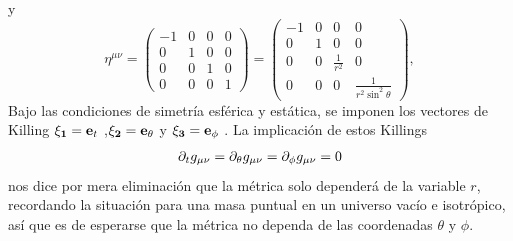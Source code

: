y
\begin{equation}
    \eta^{\mu \nu}=\left(\begin{array}{cccc}
            -1 & 0 & 0 & 0 \\
            0  & 1 & 0 & 0 \\
            0  & 0 & 1 & 0 \\
            0  & 0 & 0 & 1
        \end{array}\right)=\left(\begin{array}{cccc}
            -1 & 0 & 0               & 0                                \\
            0  & 1 & 0               & 0                                \\
            0  & 0 & \frac{1}{r^{2}} & 0                                \\
            0  & 0 & 0               & \frac{1}{r^{2} \sin ^{2} \theta}
        \end{array}\right),
\end{equation}
Bajo las condiciones de simetría esférica y estática, se imponen los  vectores de Killing $\mathbf{\xi_1 }= \mathbf{e}_t$ ,$\mathbf{\xi_2 }= \mathbf{e}_\theta$ y $\mathbf{\xi_3} = \mathbf{e}_\phi$ .
La implicación de estos Killings 
\begin{align}
\partial_{t}{g_{\mu \nu}} =\partial_{\theta}{g_{\mu \nu}}= \partial_{\phi}{g_{\mu \nu}} = 0 
\end{align}
nos dice por mera eliminación que la métrica solo dependerá de la variable $r$, recordando la situación para una masa puntual en un universo vacío e isotrópico, así que es de esperarse que la métrica no dependa de las coordenadas $\theta$ y $\phi$.


